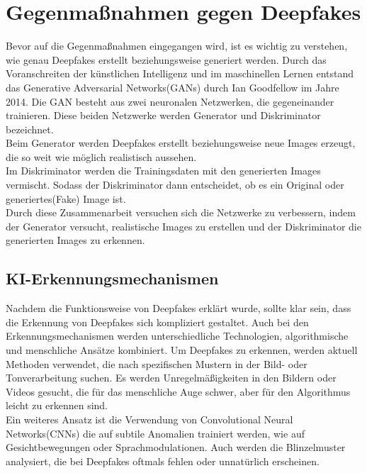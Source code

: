 \documentclass[a4paper,12pt]{article}
\begin{document}
\section{Gegenmaßnahmen gegen Deepfakes}
Bevor auf die Gegenmaßnahmen eingegangen wird,
ist es wichtig zu verstehen, wie genau Deepfakes erstellt beziehungsweise generiert werden.
Durch das Voranschreiten der künstlichen Intelligenz und im maschinellen Lernen entstand
das Generative Adversarial Networks(GANs) durch Ian Goodfellow im Jahre 2014.
Die GAN besteht aus zwei neuronalen Netzwerken, die gegeneinander trainieren.
Diese beiden Netzwerke werden Generator und Diskriminator bezeichnet.\\
Beim Generator werden Deepfakes erstellt beziehungsweise neue Images erzeugt,
die so weit wie möglich realistisch aussehen.\\ 
Im Diskriminator werden die Trainingsdaten mit den generierten Images vermischt.
Sodass der Diskriminator dann entscheidet, ob es ein Original oder generiertes(Fake) Image ist.\\
Durch diese Zusammenarbeit versuchen sich die Netzwerke zu verbessern, indem der Generator versucht, realistische Images zu erstellen und der Diskriminator die 
generierten Images zu erkennen.\cite{BVDW2024}

\subsection{KI-Erkennungsmechanismen}\label{subsec:KI-Erkennungsmechanismen}
Nachdem die Funktionsweise von Deepfakes erklärt wurde, sollte klar sein,
dass die Erkennung von Deepfakes sich kompliziert gestaltet.
Auch bei den Erkennungsmechanismen werden unterschiedliche Technologien, algorithmische und menschliche Ansätze kombiniert.
Um Deepfakes zu erkennen, werden aktuell Methoden verwendet, die nach spezifischen Mustern in der Bild- oder Tonverarbeitung suchen.
Es werden Unregelmäßigkeiten in den Bildern oder Videos gesucht, die für das menschliche Auge schwer,
aber für den Algorithmus leicht zu erkennen sind.\\
Ein weiteres Ansatz ist die Verwendung von Convolutional Neural Networks(CNNs)
die auf subtile Anomalien trainiert werden, wie auf Gesichtbewegungen oder Sprachmodulationen.
Auch werden die Blinzelmuster analysiert, die bei Deepfakes oftmals fehlen oder unnatürlich erscheinen.\cite{BVDW2024}
\end{document}
